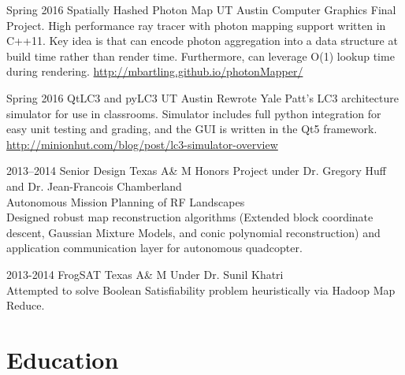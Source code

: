 \documentclass[]{friggeri-cv} %
\begin{document}
\begin{entrylist}
\entry
{Spring 2016}
{Spatially Hashed Photon Map}
{UT Austin}
{Computer Graphics Final Project. High performance ray tracer with photon mapping support written in C++11. Key idea is that can encode photon aggregation into a data structure at build time rather than render time. 
Furthermore, can leverage O(1) lookup time during rendering. \url{http://mbartling.github.io/photonMapper/}}

\entry
{Spring 2016}
{QtLC3 and pyLC3}
{UT Austin}
{Rewrote Yale Patt's LC3 architecture simulator for use in classrooms. Simulator includes full python integration for easy unit testing and grading, and the GUI is written in the Qt5 framework. \url{http://minionhut.com/blog/post/lc3-simulator-overview}}

\entry
{2013--2014}
{Senior Design}
{Texas A\& M}
{Honors Project under Dr. Gregory Huff and Dr. Jean-Francois Chamberland  \\
Autonomous Mission Planning of RF Landscapes \\
Designed robust map reconstruction algorithms (Extended block coordinate descent, Gaussian Mixture Models, and conic polynomial reconstruction) and application communication layer for autonomous quadcopter.}


\entry
{2013-2014}
{FrogSAT}
{Texas A\& M}
{Under Dr. Sunil Khatri \\
Attempted to solve Boolean Satisfiability problem heuristically via Hadoop Map Reduce.} 


\end{entrylist}



\section{Education}
\end{document}
